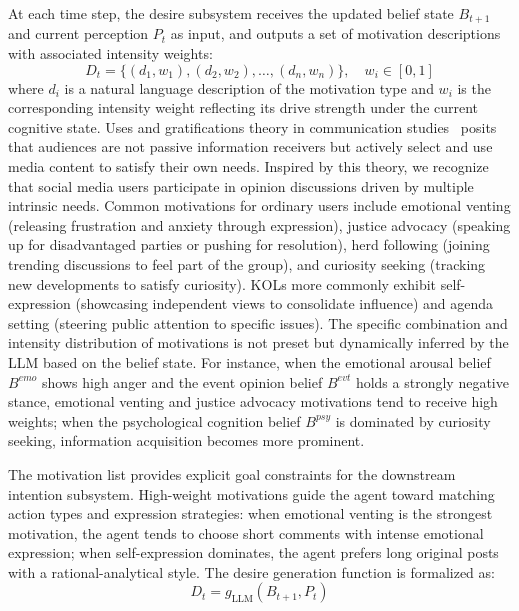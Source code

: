 \documentclass[a4paper,fleqn]{cas-dc}
\begin{document}
At each time step, the desire subsystem receives the updated belief state $B_{t+1}$ and current perception $P_t$ as input, and outputs a set of motivation descriptions with associated intensity weights:
\begin{equation}
D_t = \{(d_1, w_1), (d_2, w_2), \ldots, (d_n, w_n)\}, \quad w_i \in [0, 1]
\end{equation}
where $d_i$ is a natural language description of the motivation type and $w_i$ is the corresponding intensity weight reflecting its drive strength under the current cognitive state. Uses and gratifications theory in communication studies~\citep{katz_uses_1973} posits that audiences are not passive information receivers but actively select and use media content to satisfy their own needs. Inspired by this theory, we recognize that social media users participate in opinion discussions driven by multiple intrinsic needs. Common motivations for ordinary users include emotional venting (releasing frustration and anxiety through expression), justice advocacy (speaking up for disadvantaged parties or pushing for resolution), herd following (joining trending discussions to feel part of the group), and curiosity seeking (tracking new developments to satisfy curiosity). KOLs more commonly exhibit self-expression (showcasing independent views to consolidate influence) and agenda setting (steering public attention to specific issues). The specific combination and intensity distribution of motivations is not preset but dynamically inferred by the LLM based on the belief state. For instance, when the emotional arousal belief $B^{emo}$ shows high anger and the event opinion belief $B^{evt}$ holds a strongly negative stance, emotional venting and justice advocacy motivations tend to receive high weights; when the psychological cognition belief $B^{psy}$ is dominated by curiosity seeking, information acquisition becomes more prominent.

The motivation list provides explicit goal constraints for the downstream intention subsystem. High-weight motivations guide the agent toward matching action types and expression strategies: when emotional venting is the strongest motivation, the agent tends to choose short comments with intense emotional expression; when self-expression dominates, the agent prefers long original posts with a rational-analytical style. The desire generation function is formalized as:
\begin{equation}
D_t = g_{\text{LLM}}(B_{t+1}, P_t)
\end{equation}
\end{document}
